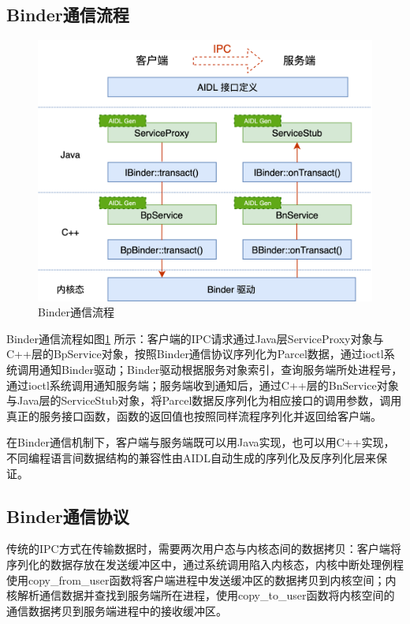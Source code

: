 \documentclass[winfonts,master,twoside]{njuthesis}
\begin{document}
\subsection{Binder通信流程}

\begin{figure}
	\centering
	\includegraphics[width=.9\textwidth]{figure/2-background/binder-workflow.png}
	\caption{Binder通信流程}
	\label{binder-workflow}
\end{figure}

Binder通信流程如图\ref{binder-workflow} 所示：客户端的IPC请求通过Java层ServiceProxy对象与C++层的BpService对象，按照Binder通信协议序列化为Parcel数据，通过ioctl系统调用通知Binder驱动；Binder驱动根据服务对象索引，查询服务端所处进程号，通过ioctl系统调用通知服务端；服务端收到通知后，通过C++层的BnService对象与Java层的ServiceStub对象，将Parcel数据反序列化为相应接口的调用参数，调用真正的服务接口函数，函数的返回值也按照同样流程序列化并返回给客户端。

在Binder通信机制下，客户端与服务端既可以用Java实现，也可以用C++实现，不同编程语言间数据结构的兼容性由AIDL自动生成的序列化及反序列化层来保证。

\subsection{Binder通信协议}

传统的IPC方式在传输数据时，需要两次用户态与内核态间的数据拷贝：客户端将序列化的数据存放在发送缓冲区中，通过系统调用陷入内核态，内核中断处理例程使用copy\_from\_user函数将客户端进程中发送缓冲区的数据拷贝到内核空间；内核解析通信数据并查找到服务端所在进程，使用copy\_to\_user函数将内核空间的通信数据拷贝到服务端进程中的接收缓冲区。
\end{document}
